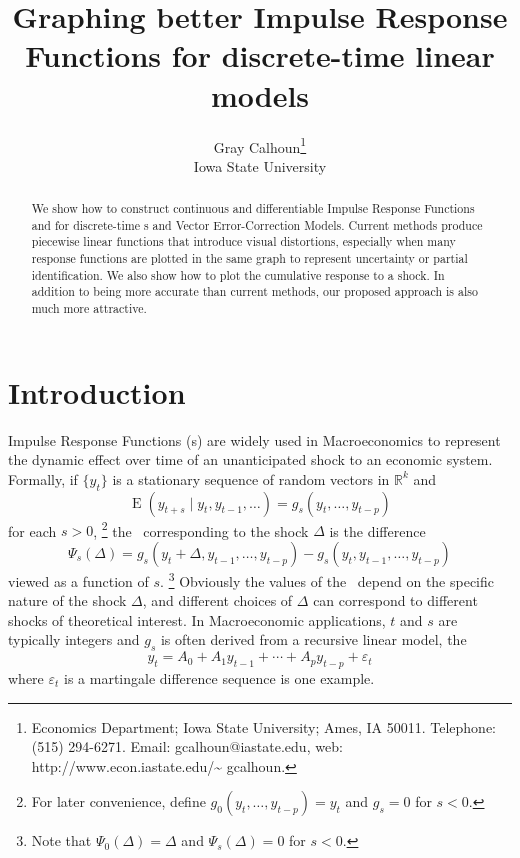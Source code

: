 \documentclass[12pt,fleqn]{article}
\date{\VERSION}
\author{Gray Calhoun\thanks{Economics Department; Iowa State
    University; Ames, IA 50011. Telephone: (515) 294-6271.  Email:
    \guillemotleft gcalhoun@iastate.edu\guillemotright, web:
    \guillemotleft http://www.econ.iastate.edu/\textasciitilde
    gcalhoun\guillemotright.} \\
  Iowa State University}
\title{Graphing better Impulse Response Functions for discrete-time
  linear models}
\DeclareMathOperator{\E}{E}
\newcommand{\vep}{\varepsilon}
\newcommand{\RR}{\mathbb{R}}
\begin{document}
\maketitle
\begin{abstract}\noindent%
  We show how to construct continuous and differentiable
  Impulse Response Functions and for discrete-time \VAR s and Vector
  Error-Correction Models. Current methods produce piecewise linear
  functions that introduce visual distortions, especially when many
  response functions are plotted in the same graph to represent
  uncertainty or partial identification. We also show how to plot the
  cumulative response to a shock. In addition to being more accurate
  than current methods, our proposed approach is also much more attractive.
\end{abstract}

\tableofcontents
\newpage

\section{Introduction}

Impulse Response Functions (\IRF s) are widely used in Macroeconomics
to represent the dynamic effect over time of an unanticipated shock to
an economic system. Formally, if $\{y_t\}$ is a stationary sequence of
random vectors in $\RR^k$ and
\[
\E(y_{t+s} \mid y_t, y_{t-1},\dots) = g_s(y_t,\dots,y_{t-p})
\]
for each $s > 0$,%
\footnote{For later convenience, define
  $g_0(y_t,\dots,y_{t-p}) = y_t$ and $g_s = 0$ for $s < 0$.} %
the \IRF\ corresponding to the shock $\Delta$ is the difference
\[
\Psi_s(\Delta) = g_s(y_t + \Delta, y_{t-1},\dots,y_{t-p}) - g_s(y_t, y_{t-1},\dots,y_{t-p})
\]
viewed as a function of $s$.%
\footnote{Note that $\Psi_0(\Delta) = \Delta$ and $\Psi_s(\Delta) = 0$ for $s <
  0$.} %
Obviously the values of the \IRF\ depend on the specific nature of the
shock $\Delta$, and different choices of $\Delta$ can correspond to
different shocks of theoretical interest.  In Macroeconomic
applications, $t$ and $s$ are typically integers and $g_s$ is often
derived from a recursive linear model, the \VAR
\begin{equation}\label{eq:1}
  y_t = A_0 + A_1 y_{t-1} + \cdots + A_p y_{t-p} + \vep_t
\end{equation}
where $\vep_t$ is a martingale difference sequence is one example.
\end{document}
